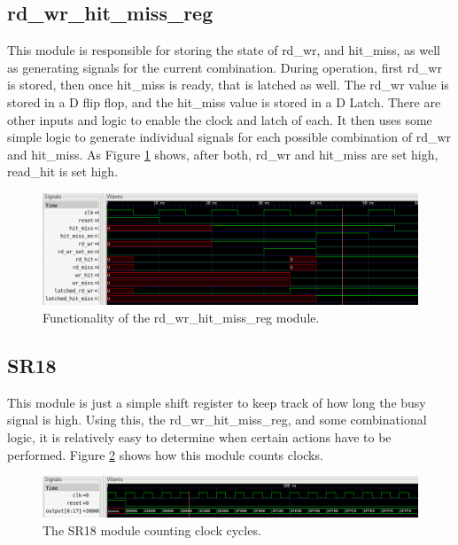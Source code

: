 \documentclass[10pt]{article}
\begin{document}
\subsection{rd_wr_hit_miss_reg}
This module is responsible for storing the state of rd_wr, and hit_miss, as well
as generating signals for the current combination. During operation, first rd_wr
is stored, then once hit_miss is ready, that is latched as well. The rd_wr value
is stored in a D flip flop, and the hit_miss value is stored in a D Latch. There
are other inputs and logic to enable the clock and latch of each. It then uses
some simple logic to generate individual signals for each possible combination
of rd_wr and hit_miss. As Figure \ref{rwhm} shows, after both, rd_wr and
hit_miss are set high, read_hit is set high.

\begin{figure}
    \centering
    \includegraphics[width=\textwidth]{rwhm.png}
    \caption{Functionality of the rd_wr_hit_miss_reg module.}
    \label{rwhm}
\end{figure}

\subsection{SR18}
This module is just a simple shift register to keep track of how long the busy
signal is high. Using this, the rd_wr_hit_miss_reg, and some combinational
logic, it is relatively easy to determine when certain actions have to be
performed. Figure \ref{sr18} shows how this module counts clocks.

\begin{figure}
    \centering
    \includegraphics[width=\textwidth]{sr18.png}
    \caption{The SR18 module counting clock cycles.}
    \label{sr18}
\end{figure}
\end{document}
